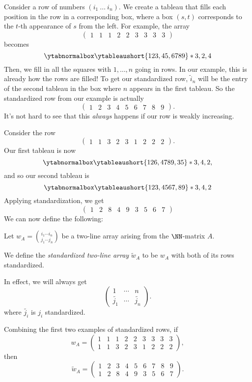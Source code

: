 \documentclass{article}
\begin{document}
Consider a row of numbers $(i_1\: \ldots\: i_n)$. 
We create a tableau that fills each position in the row in a corresponding box, where a box $(s,t)$ corresponds to the $t$-th appearance of $s$ from the left.
For example, the array
\[
    \begin{pmatrix}
        1 & 1 & 1 & 2 & 2 & 3 & 3 & 3 & 3
    \end{pmatrix}
\]
becomes
\[
    \ytabnormalbox
    \ytableaushort{123,45,6789}*{3,2,4}
\]
Then, we fill in all the squares with $1,\ldots,n$ going in rows.
In our example, this is already how the rows are filled!
To get our standardized row, $\tilde{i}_n$ will be the entry of the second tableau in the box where $n$ appears in the first tableau.
So the standardized row from our example is actually
\[
    \begin{pmatrix}
        1 & 2 & 3 & 4 & 5 & 6 & 7 & 8 & 9
    \end{pmatrix}.
\]
It's not hard to see that this \textit{always} happens if our row is weakly increasing.

Consider the row
\[
    \begin{pmatrix}
        1 & 1 & 3 & 2 & 3 & 1 & 2 & 2 & 2
    \end{pmatrix}.
\]
Our first tableau is now
\[
    \ytabnormalbox
    \ytableaushort{126,4789,35}*{3,4,2},
\]
and so our second tableau is
\[
    \ytabnormalbox
    \ytableaushort{123,4567,89}*{3,4,2}
\]
Applying standardization, we get
\[
    \begin{pmatrix}
        1 & 2 & 8 & 4 & 9 & 3 & 5 & 6 & 7
    \end{pmatrix}
\]
We can now define the following:

\begin{definition}
    Let $w_A = \binom{i_1\cdots i_n}{j_1\cdots j_n}$ be a two-line array arising from the $\NN$-matrix $A$.

    We define the \textit{standardized two-line array} $\widetilde{w}_A$ to be $w_A$ with both of its rows standardized. 
\end{definition}

In effect, we will always get 
\[
    \begin{pmatrix}
        1 & \cdots & n \\
        \widetilde{j_1} & \cdots & \widetilde{j_n}
    \end{pmatrix}.
\]
where $\widetilde{j_i}$ is $j_i$ standardized.

\begin{example}
    Combining the first two examples of standardized rows, if
    \[
        w_A = \begin{pmatrix}
            1 & 1 & 1 & 2 & 2 & 3 & 3 & 3 & 3 \\
            1 & 1 & 3 & 2 & 3 & 1 & 2 & 2 & 2
        \end{pmatrix},
    \]
    then
    \[
        \widetilde{w}_A = \begin{pmatrix}
            1 & 2 & 3 & 4 & 5 & 6 & 7 & 8 & 9 \\
1 & 2 & 8 & 4 & 9 & 3 & 5 & 6 & 7
        \end{pmatrix}.
    \]
\end{example}
\end{document}
